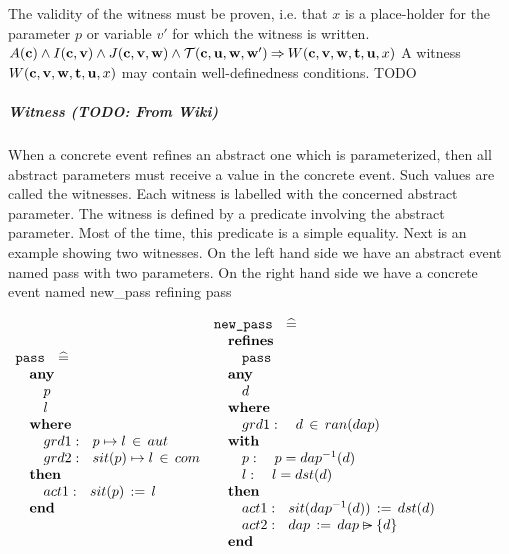 The validity of the witness must be proven, i.e. that $x$ is a place-holder for the parameter $p$ or variable $v'$ for which the witness is written.
%
  {$A(\mathbf{c}) \land I(\mathbf{c},\mathbf{v}) \land J(\mathbf{c},{\mathbf{v},\mathbf{w}}) \land
    \mathcal{T}(\mathbf{c},\mathbf{u},\mathbf{w},\mathbf{w}') \mathbin\Rightarrow
    W(\mathbf{c},{\mathbf{v},\mathbf{w}},{\mathbf{t},\mathbf{u}},x)$}
A witness $W(\mathbf{c},{\mathbf{v},\mathbf{w}},{\mathbf{t},\mathbf{u}},x)$ may contain well-definedness conditions.
%
  {TODO}

\subparagraph{Witness (TODO: From Wiki)}

When a concrete event refines an abstract one which is parameterized, then all abstract parameters must receive a value in the concrete event. Such values are called the witnesses. Each witness is labelled with the concerned abstract parameter. The witness is defined by a predicate involving the abstract parameter. Most of the time, this predicate is a simple equality. Next is an example showing two witnesses. On the left hand side we have an abstract event named pass with two parameters. On the right hand side we have a concrete event named new\_pass refining pass 

$\begin{array}{l} \texttt{pass} \ \ \defi \\ \quad \textbf{any} \\ \quad \quad p \\ \quad \quad l \\ \quad \textbf{where}\\ \quad \quad grd1: \ \ {p \mapsto l \,\in\, aut}\\ \quad \quad grd2: \ \ sit(p)\mapsto l \,\in\, com \\ \quad \textbf{then} \\ \quad \quad act1: \ \ sit(p) \,:=\, l \\ \quad \textbf{end} \end{array}
\begin{array}{l} \texttt{new\_pass} \ \ \defi \\ \quad \textbf{refines} \\ \quad \quad \texttt{pass} \\ \quad \textbf{any} \\ \quad \quad d \\ \quad \textbf{where}\\ \quad \quad grd1: \ \ \ d \,\in\, ran(dap) \\ \quad \textbf{with} \\ \quad \quad p: \ \ \ p=dap^{-1}(d) \\ \quad \quad l: \ \ \ l=dst(d) \\ \quad \textbf{then} \\ \quad \quad act1: \ \ sit(dap^{-1}(d)) \,:=\, dst(d) \ \\ \quad \quad act2: \ \ dap \,:=\, dap \ransub \{d\} \\ \quad \textbf{end} \end{array} $

